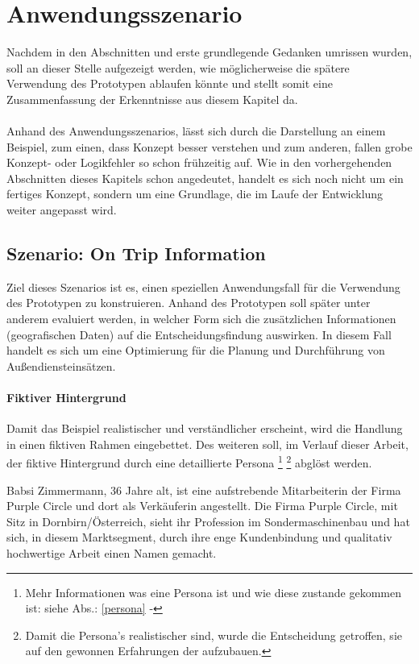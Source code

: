 \documentclass[Bachelorarbeit.tex]{subfiles}
\begin{document}
\section{Anwendungsszenario}
\label{sec:anwendungsszenario}
Nachdem in den Abschnitten  und  erste grundlegende Gedanken umrissen wurden, soll an dieser Stelle aufgezeigt werden, wie möglicherweise die spätere Verwendung des Prototypen ablaufen könnte und stellt somit eine Zusammenfassung der Erkenntnisse aus diesem Kapitel da.\\
\\
Anhand des Anwendungsszenarios, lässt sich durch die Darstellung an einem Beispiel, zum einen, dass Konzept besser verstehen und zum anderen, fallen grobe Konzept- oder Logikfehler so schon frühzeitig auf.
Wie in den vorhergehenden Abschnitten dieses Kapitels schon angedeutet, handelt es sich noch nicht um ein fertiges Konzept, sondern um eine Grundlage, die im Laufe der Entwicklung weiter angepasst wird.

\subsection{Szenario: On Trip Information }
Ziel dieses Szenarios ist es, einen speziellen Anwendungsfall für die Verwendung des Prototypen zu konstruieren. 
Anhand des Prototypen soll später unter anderem evaluiert werden, in welcher Form sich die zusätzlichen Informationen (geografischen Daten) auf die Entscheidungsfindung auswirken.
In diesem Fall handelt es sich um eine Optimierung für die Planung und Durchführung von Außendiensteinsätzen. 

\paragraph*{Fiktiver Hintergrund}
Damit das Beispiel realistischer und verständlicher erscheint, wird die Handlung in einen fiktiven Rahmen eingebettet. 
Des weiteren soll, im Verlauf dieser Arbeit, der fiktive Hintergrund durch eine detaillierte Persona
\footnote{
	Mehr Informationen was eine Persona ist und wie diese zustande gekommen ist: siehe Abs.: \ref{persona} - 
	} 
\footnote{
	Damit die Persona's realistischer sind, wurde die Entscheidung getroffen,
	sie auf den gewonnen Erfahrungen der  aufzubauen.
	} 
abglöst werden.
\newpage

Babsi Zimmermann, 36 Jahre alt, ist eine aufstrebende Mitarbeiterin der Firma Purple Circle und dort als Verkäuferin angestellt. 
Die Firma Purple Circle, mit Sitz in Dornbirn/Österreich, sieht ihr Profession im Sondermaschinenbau und hat sich, in diesem Marktsegment, durch ihre enge Kundenbindung und qualitativ hochwertige Arbeit einen Namen gemacht. 
\end{document}

